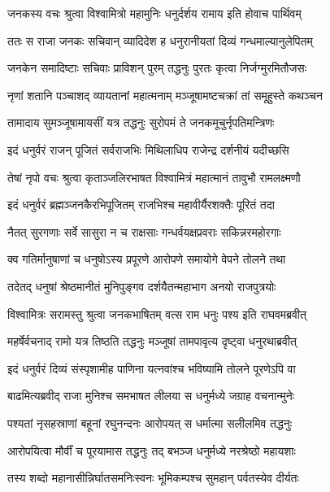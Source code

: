 
\twolineshloka
{जनकस्य वचः श्रुत्वा विश्वामित्रो महामुनिः}
{धनुर्दर्शय रामाय इति होवाच पार्थिवम्} %

\twolineshloka
{ततः स राजा जनकः सचिवान् व्यादिदेश ह}
{धनुरानीयतां दिव्यं गन्धमाल्यानुलेपितम्} %

\twolineshloka
{जनकेन समादिष्टाः सचिवाः प्राविशन् पुरम्}
{तद्धनुः पुरतः कृत्वा निर्जग्मुरमितौजसः} %

\twolineshloka
{नृणां शतानि पञ्चाशद् व्यायतानां महात्मनाम्}
{मञ्जूषामष्टचक्रां तां समूहुस्ते कथञ्चन} %

\twolineshloka
{तामादाय सुमञ्जूषामायसीं यत्र तद्धनुः}
{सुरोपमं ते जनकमूचुर्नृपतिमन्त्रिणः} %

\twolineshloka
{इदं धनुर्वरं राजन् पूजितं सर्वराजभिः}
{मिथिलाधिप राजेन्द्र दर्शनीयं यदीच्छसि} %

\twolineshloka
{तेषां नृपो वचः श्रुत्वा कृताञ्जलिरभाषत}
{विश्वामित्रं महात्मानं तावुभौ रामलक्ष्मणौ} %

\twolineshloka
{इदं धनुर्वरं ब्रह्मञ्जनकैरभिपूजितम्}
{राजभिश्च महावीर्यैरशक्तैः पूरितं तदा} %

\twolineshloka
{नैतत् सुरगणाः सर्वे सासुरा न च राक्षसाः}
{गन्धर्वयक्षप्रवराः सकिन्नरमहोरगाः} %

\twolineshloka
{क्व गतिर्मानुषाणां च धनुषोऽस्य प्रपूरणे}
{आरोपणे समायोगे वेपने तोलने तथा} %

\twolineshloka
{तदेतद् धनुषां श्रेष्ठमानीतं मुनिपुङ्गव}
{दर्शयैतन्महाभाग अनयो राजपुत्रयोः} %

\twolineshloka
{विश्वामित्रः सरामस्तु श्रुत्वा जनकभाषितम्}
{वत्स राम धनुः पश्य इति राघवमब्रवीत्} %

\twolineshloka
{महर्षेर्वचनाद् रामो यत्र तिष्ठति तद्धनुः}
{मञ्जूषां तामपावृत्य दृष्ट्वा धनुरथाब्रवीत्} %

\twolineshloka
{इदं धनुर्वरं दिव्यं संस्पृशामीह पाणिना}
{यत्नवांश्च भविष्यामि तोलने पूरणेऽपि वा} %

\twolineshloka
{बाढमित्यब्रवीद् राजा मुनिश्च समभाषत}
{लीलया स धनुर्मध्ये जग्राह वचनान्मुनेः} %

\twolineshloka
{पश्यतां नृसहस्राणां बहूनां रघुनन्दनः}
{आरोपयत् स धर्मात्मा सलीलमिव तद्धनुः} %

\twolineshloka
{आरोपयित्वा मौर्वीं च पूरयामास तद्धनुः}
{तद् बभञ्ज धनुर्मध्ये नरश्रेष्ठो महायशाः} %

\twolineshloka
{तस्य शब्दो महानासीन्निर्घातसमनिःस्वनः}
{भूमिकम्पश्च सुमहान् पर्वतस्येव दीर्यतः} %

